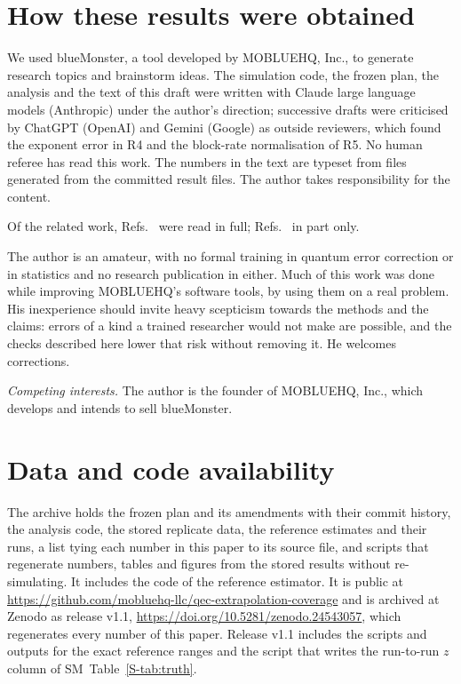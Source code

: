\documentclass[aps,pre,twocolumn,superscriptaddress,nofootinbib,10pt]{revtex4-2}
\newcommand{\SM}{SM}
\begin{document}
\section*{How these results were obtained}
We used blueMonster, a tool developed by MOBLUEHQ, Inc., to generate research topics and brainstorm ideas. The simulation code, the frozen plan, the analysis and the text of this draft were written with Claude large language models (Anthropic) under the author's direction; successive drafts were criticised by ChatGPT (OpenAI) and Gemini (Google) as outside reviewers, which found the exponent error in R4 and the block-rate normalisation of R5. No human referee has read this work. The numbers in the text are typeset from files generated from the committed result files. The author takes responsibility for the content.

Of the related work, Refs.~\cite{beverland2025,ye2026,molavi2026} were read in full; Refs.~\cite{mayer2025,mullan2026,heussen2024} in part only.

The author is an amateur, with no formal training in quantum error correction or in statistics and no research publication in either. Much of this work was done while improving MOBLUEHQ's software tools, by using them on a real problem. His inexperience should invite heavy scepticism towards the methods and the claims: errors of a kind a trained researcher would not make are possible, and the checks described here lower that risk without removing it. He welcomes corrections.

\emph{Competing interests.} The author is the founder of MOBLUEHQ, Inc., which develops and intends to sell blueMonster.

\section*{Data and code availability}
The archive holds the frozen plan and its amendments with their commit history, the analysis code, the stored replicate data, the reference estimates and their runs, a list tying each number in this paper to its source file, and scripts that regenerate numbers, tables and figures from the stored results without re-simulating. It includes the code of the reference estimator. It is public at \url{https://github.com/mobluehq-llc/qec-extrapolation-coverage} and is archived at Zenodo as release v1.1, \url{https://doi.org/10.5281/zenodo.24543057}, which regenerates every number of this paper. Release v1.1 includes the scripts and outputs for the exact reference ranges and the script that writes the run-to-run $z$ column of \SM\ Table~\ref{S-tab:truth}.


\end{document}
